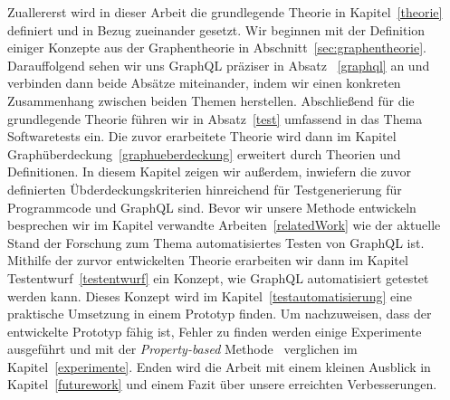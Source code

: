 Zuallererst wird in dieser Arbeit die grundlegende Theorie in Kapitel~\ref{theorie} definiert und in Bezug zueinander gesetzt.
Wir beginnen mit der Definition einiger Konzepte aus der Graphentheorie in Abschnitt~\ref{sec:graphentheorie}.
Darauffolgend sehen wir uns GraphQL präziser in Absatz ~\ref{graphql} an und verbinden dann beide Absätze miteinander, indem wir einen
konkreten Zusammenhang zwischen beiden Themen herstellen.
Abschließend für die grundlegende Theorie führen wir in Absatz~\ref{test} umfassend in das Thema Softwaretests ein.
Die zuvor erarbeitete Theorie wird dann im Kapitel Graphüberdeckung~\ref{graphueberdeckung} erweitert durch Theorien und Definitionen.
In diesem Kapitel zeigen wir außerdem, inwiefern die zuvor definierten Übderdeckungskriterien hinreichend für Testgenerierung für Programmcode und GraphQL sind.
Bevor wir unsere Methode entwickeln besprechen wir im Kapitel verwandte Arbeiten~\ref{relatedWork} wie der aktuelle Stand der Forschung zum Thema
automatisiertes Testen von GraphQL ist.
Mithilfe der zurvor entwickelten Theorie erarbeiten wir dann im Kapitel Testentwurf~\ref{testentwurf} ein Konzept, wie GraphQL automatisiert getestet werden kann.
Dieses Konzept wird im Kapitel~\ref{testautomatisierung} eine praktische Umsetzung in einem Prototyp finden.
Um nachzuweisen, dass der entwickelte Prototyp fähig ist, Fehler zu finden werden einige Experimente ausgeführt und mit
der \textit{Property-based} Methode~\cite{property-based-testing} verglichen im Kapitel~\ref{experimente}.
Enden wird die Arbeit mit einem kleinen Ausblick in Kapitel~\ref{futurework} und einem Fazit über unsere erreichten Verbesserungen.